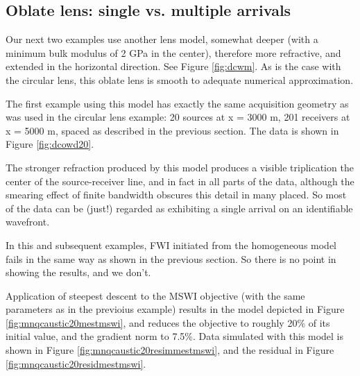 \subsection{Oblate lens: single vs. multiple arrivals}

Our next two examples use another lens model, somewhat deeper (with a
minimum bulk modulus of 2 GPa in the center), therefore more
refractive, and extended in the
horizontal direction. See Figure \ref{fig:dcwm}. As is the case with
the circular lens, this oblate lens is smooth to adequate numerical
approximation.


The first example using this model has exactly the same acquisition
geometry as was used in the circular lens example: 20 sources at x =
3000 m, 201 receivers at x = 5000 m, spaced as described in the
previous section. The data is shown in Figure \ref{fig:dcowd20}. 


The stronger refraction produced by this model produces a visible triplication
the center of the source-receiver line, and in fact in all parts of
the data, although the smearing effect of finite bandwidth obscures this
detail in many placed. So most of the data can be (just!) regarded as exhibiting a single
arrival on an identifiable wavefront.

In this and subsequent examples, FWI initiated from the homogeneous
model fails in the same way as shown in the  previous section. So
there is no point in showing the results, and we don't.

Application of steepest descent to the MSWI objective (with the same
parameters as in the previoius example) results in the model depicted
in Figure \ref{fig:mnqcaustic20mestmswi}, and reduces the objective to
roughly 20\% of its initial value, and the gradient norm to 7.5\%. Data
simulated with this model is shown in Figure
\ref{fig:mnqcaustic20resimmestmswi}, and the residual in Figure
\ref{fig:mnqcaustic20residmestmswi}.



